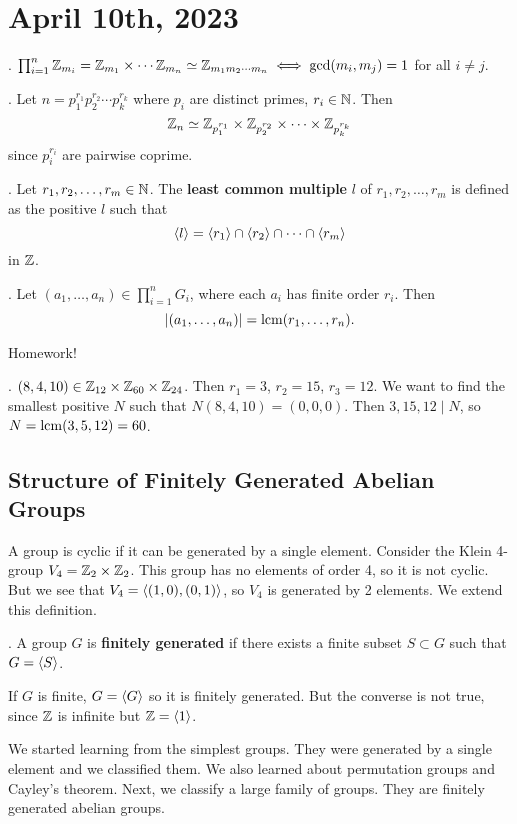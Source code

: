 \section*{April 10th, 2023}

\cor. \(\prod_{i=1}^n \mathbb{Z}_{m_i} = \mathbb{Z}_{m_1} \times \cdots \mathbb{Z}_{m_n} \simeq \mathbb{Z}_{m_1 m_2 \cdots m_n} \iff \gcd(m_i, m_j) = 1\) for all \(i \neq j\).

\ex. Let \(n = p_1^{r_1}p_2^{r_2} \cdots p_k^{r_k}\) where \(p_i\) are distinct primes, \(r_i \in \mathbb{N}\). Then
\[
    \mathbb{Z}_n \simeq \mathbb{Z}_{p_1^{r_1}} \times \mathbb{Z}_{p_2^{r_2}} \times \cdots \times \mathbb{Z}_{p_k^{r_k}}
\]
since \(p_i^{r_i}\) are pairwise coprime.

.  Let \(r_1, r_2, \dots, r_m \in \mathbb{N}\). The \textbf{least common multiple} \(l\) of \(r_1, r_2, \dots, r_m\) is defined as the positive \(l\) such that
\[
    \left\langle l \right\rangle = \left\langle r_1 \right\rangle \cap \left\langle r_2 \right\rangle \cap \cdots \cap \left\langle r_m \right\rangle
\]
in \(\mathbb{Z}\).

\thm. Let \((a_1, \dots, a_n) \in \prod_{i=1}^n G_i\), where each \(a_i\) has finite order \(r_i\). Then
\[
    \left| (a_1, \dots, a_n) \right| = {\rm lcm}(r_1, \dots, r_n).
\]

\pf Homework!

\ex. \((8, 4, 10) \in \mathbb{Z}_{12} \times \mathbb{Z}_{60} \times \mathbb{Z}_{24}\). Then \(r_1 = 3\), \(r_2 = 15\), \(r_3 = 12\). We want to find the smallest positive \(N\) such that \(N (8, 4, 10) = (0, 0, 0)\). Then \(3, 15, 12 \mid N\), so \(N = {\rm lcm}(3, 5, 12) = 60\).

\subsection*{Structure of Finitely Generated Abelian Groups}

A group is cyclic if it can be generated by a single element. Consider the Klein 4-group \(V_4 = \mathbb{Z}_2 \times \mathbb{Z}_2\). This group has no elements of order 4, so it is not cyclic. But we see that \(V_4 = \left\langle (1, 0), (0, 1) \right\rangle\), so \(V_4\) is generated by 2 elements. We extend this definition.

.  A group \(G\) is \textbf{finitely generated} if there exists a finite subset \(S \subset G\) such that \(G = \left\langle S \right\rangle\).

\rmk If \(G\) is finite, \(G = \left\langle G \right\rangle\) so it is finitely generated. But the converse is not true, since \(\mathbb{Z}\) is infinite but \(\mathbb{Z} = \left\langle 1 \right\rangle\).

We started learning from the simplest groups. They were generated by a single element and we classified them. We also learned about permutation groups and Cayley's theorem. Next, we classify a large family of groups. They are finitely generated abelian groups.

